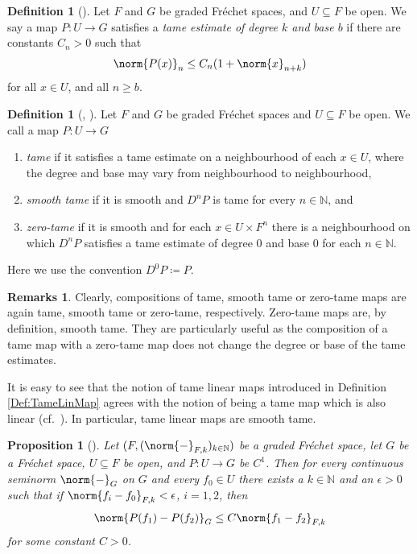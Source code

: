 \documentclass[12pt,a4paper]{article}
\theoremstyle{plain}
\newtheorem{proposition}[theorem]{Proposition}
\theoremstyle{definition}
\newtheorem{definition}[theorem]{Definition}
\newtheorem{remarks}[theorem]{Remarks}
\newcommand{\N}{\mathbb{N}}
\newcommand{\nnorm}[2]{\norm{#1}_{#2}}
\begin{document}
\begin{definition}[{\cite[Part II, Definition 2.2.1]{hamilton}}]
Let $F$ and $G$ be graded Fréchet spaces, and $U\subseteq F$ be open. We say a map $P:U\to G$ satisfies a \textit{tame estimate of degree $k$ and base $b$} if there are constants $C_n>0$ such that
\begin{align*}
    \nnorm{P(x)}{n}\leq C_n (1+\nnorm{x}{n+k})
\end{align*}
for all $x\in U$, and all $n\geq b$.
\end{definition}


\begin{definition}[{\cite[Part II, Definition 2.1.1, and p.~143]{hamilton}, \cite[Definition 2.2.11]{RWang}}]
Let $F$ and $G$ be graded Fréchet spaces and $U\subseteq F$ be open. We call a map $P:U\to G$ 
\begin{enumerate}
    \item \textit{tame} if it satisfies a tame estimate on a neighbourhood of each $x\in U$, where the degree and base may vary from neighbourhood to neighbourhood,
    \item \textit{smooth tame} if it is smooth and $D^nP$ is tame for every $n\in \N$, and
    \item \textit{zero-tame} if it is smooth and for each $x\in U\times F^n$ there is a neighbourhood on which $D^nP$ satisfies a tame estimate of degree $0$ and base $0$ for each $n\in \N$.
\end{enumerate}
Here we use the convention $D^0P\coloneqq P$.
\end{definition}

\begin{remarks}
Clearly, compositions of tame, smooth tame or zero-tame maps are again tame, smooth tame or zero-tame, respectively. Zero-tame maps are, by definition, smooth tame. They are particularly useful as the composition of a tame map with a zero-tame map does not change the degree or base of the tame estimates.

It is easy to see that the notion of tame linear maps introduced in Definition \ref{Def:TameLinMap} agrees with the notion of being a tame map which is also linear (cf.~\cite[Part II, Theorem 2.1.5]{hamilton}). In particular, tame linear maps are smooth tame.
\end{remarks}




\begin{proposition}[{\cite[Part I, Theorem 5.1.3]{hamilton}}]
\label{Prop:LipschitzCont}
Let $(F,(\nnorm{-}{F,k})_{k\in \N})$ be a graded Fréchet space, let $G$ be a Fréchet space, $U\subseteq F$ be open, and $P:U\to G$ be $C^1$. Then for every continuous seminorm $\nnorm{-}{G}$ on $G$ and every $f_0\in U$ there exists a $k\in \N$ and an $\epsilon>0$ such that if $\nnorm{f_i-f_0}{F,k}<\epsilon$, $i=1,2$, then
\begin{align*}
    \nnorm{P(f_1)-P(f_2)}{G}\leq C \nnorm{f_1-f_2}{F,k}
\end{align*}
for some constant $C>0$.
\end{proposition}
\end{document}
